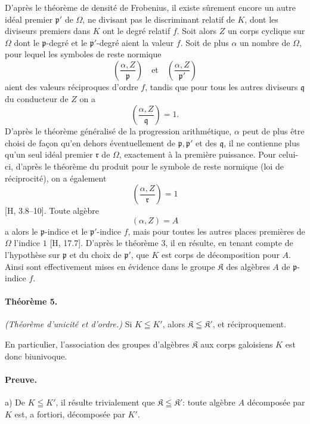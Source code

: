 D'après le théorème de densité de Frobenius, il existe sûrement encore un autre idéal premier \(\mathfrak p'\) de \(\Omega\), ne divisant pas le discriminant relatif de \(K\), dont les diviseurs premiers dans \(K\) ont le degré relatif \(f\). Soit alors \(Z\) un corps cyclique sur \(\Omega\) dont le \(\mathfrak p\)-degré et le \(\mathfrak p'\)-degré aient la valeur \(f\). Soit de plus \(\alpha\) un nombre de \(\Omega\), pour lequel les symboles de reste normique
\[
\left(\frac{\alpha,Z}{\mathfrak p}\right)\quad\text{et}\quad
\left(\frac{\alpha,Z}{\mathfrak p'}\right)
\]
aient des valeurs réciproques d'ordre \(f\), tandis que pour tous les autres diviseurs \(\mathfrak q\) du conducteur de \(Z\) on a
\[
\left(\frac{\alpha,Z}{\mathfrak q}\right)=1.
\]
D'après le théorème généralisé de la progression arithmétique, \(\alpha\) peut de plus être choisi de façon qu'en dehors éventuellement de \(\mathfrak p,\mathfrak p'\) et des \(\mathfrak q\), il ne contienne plus qu'un seul idéal premier \(\mathfrak r\) de \(\Omega\), exactement à la première puissance. Pour celui-ci, d'après le théorème du produit pour le symbole de reste normique (loi de réciprocité), on a également
\[
\left(\frac{\alpha,Z}{\mathfrak r}\right)=1
\]
[H, 3.8--10]. Toute algèbre
\[
        (\alpha,Z)=A
\]
a alors le \(\mathfrak p\)-indice et le \(\mathfrak p'\)-indice \(f\), mais pour toutes les autres places premières de \(\Omega\) l'indice \(1\) [H, 17.7]. D'après le théorème 3, il en résulte, en tenant compte de l'hypothèse sur \(\mathfrak p\) et du choix de \(\mathfrak p'\), que \(K\) est corps de décomposition pour \(A\). Ainsi sont effectivement mises en évidence dans le groupe \(\mathfrak K\) des algèbres \(A\) de \(\mathfrak p\)-indice \(f\).

\paragraph{Théorème 5.}
\emph{(Théorème d'unicité et d'ordre.)} Si \(K\leqq K'\), alors \(\mathfrak K\leqq\mathfrak K'\), et réciproquement.

En particulier, l'association des groupes d'algèbres \(\mathfrak K\) aux corps galoisiens \(K\) est donc biunivoque.

\paragraph{Preuve.}
a) De \(K\leqq K'\), il résulte trivialement que \(\mathfrak K\leqq\mathfrak K'\): toute algèbre \(A\) décomposée par \(K\) est, a fortiori, décomposée par \(K'\).

